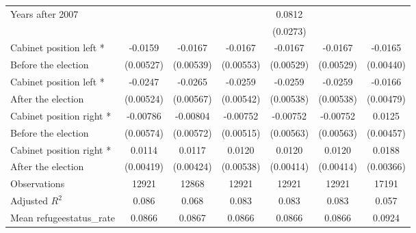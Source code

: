 \begin{table}[!ht]
\begin{tabular}{l*{6}{c}}
Years after 2007    &                     &                     &                     &      0.0812\sym{**} &                     &                     \\
                    &                     &                     &                     &    (0.0273)         &                     &                     \\
[0,5em]
Cabinet position left * &     -0.0159\sym{**} &     -0.0167\sym{**} &     -0.0167\sym{**} &     -0.0167\sym{**} &     -0.0167\sym{**} &     -0.0165\sym{***}\\
Before the election                    &   (0.00527)         &   (0.00539)         &   (0.00553)         &   (0.00529)         &   (0.00529)         &   (0.00440)         \\
[0,5em]
Cabinet position left * &     -0.0247\sym{***}&     -0.0265\sym{***}&     -0.0259\sym{***}&     -0.0259\sym{***}&     -0.0259\sym{***}&     -0.0166\sym{**} \\
After the election                    &   (0.00524)         &   (0.00567)         &   (0.00542)         &   (0.00538)         &   (0.00538)         &   (0.00479)         \\
[0,5em]
Cabinet position right * &    -0.00786         &    -0.00804         &    -0.00752         &    -0.00752         &    -0.00752         &      0.0125\sym{**} \\
Before the election                    &   (0.00574)         &   (0.00572)         &   (0.00515)         &   (0.00563)         &   (0.00563)         &   (0.00457)         \\
[0,5em]
Cabinet position right * &      0.0114\sym{**} &      0.0117\sym{**} &      0.0120\sym{*}  &      0.0120\sym{**} &      0.0120\sym{**} &      0.0188\sym{***}\\
After the election                    &   (0.00419)         &   (0.00424)         &   (0.00538)         &   (0.00414)         &   (0.00414)         &   (0.00366)         \\
\hline
Observations        &       12921         &       12868         &       12921         &       12921         &       12921         &       17191         \\
Adjusted \(R^{2}\)  &       0.086         &       0.068         &       0.083         &       0.083         &       0.083         &       0.057         \\
Mean refugeestatus\_rate&      0.0866         &      0.0867         &      0.0866         &      0.0866         &      0.0866         &      0.0924         \\

\end{tabular}
\end{table}
